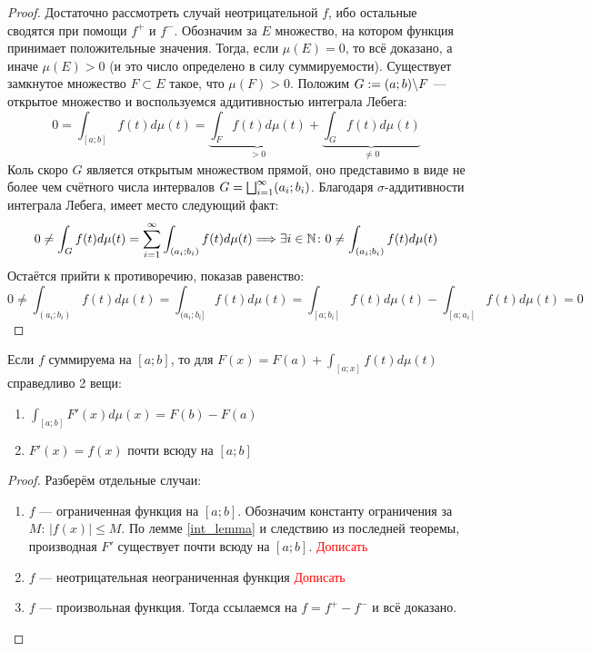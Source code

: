 \begin{proof}
	Достаточно рассмотреть случай неотрицательной $f$, ибо остальные сводятся при помощи $f^+$ и $f^-$. Обозначим за $E$ множество, на котором функция принимает положительные значения. Тогда, если $\mu(E) = 0$, то всё доказано, а иначе $\mu(E) > 0$ (и это число определено в силу суммируемости). Существует замкнутое множество $F \subset E$ такое, что $\mu(F) > 0$. Положим $G := (a; b) \backslash F$ --- открытое множество и воспользуемся аддитивностью интеграла Лебега:
	\[
		0 = \int_{[a; b]} f(t)d\mu(t) = \underbrace{\int_F f(t)d\mu(t)}_{> 0} + \underbrace{\int_G f(t)d\mu(t)}_{\neq 0}
	\]
	Коль скоро $G$ является открытым множеством прямой, оно представимо в виде не более чем счётного числа интервалов $G = \bigsqcup_{i = 1}^\infty (a_i; b_i)$. Благодаря $\sigma$-аддитивности интеграла Лебега, имеет место следующий факт:
	\[
		0 \neq \int_G f(t)d\mu(t) = \sum_{i = 1}^\infty \int_{(a_i; b_i)} f(t)d\mu(t) \Longrightarrow \exists i \in \mathbb{N} \colon 0 \neq \int_{(a_i; b_i)} f(t)d\mu(t)
	\]
	Остаётся прийти к противоречию, показав равенство:
	\[
		0 \neq \int_{(a_i; b_i)} f(t)d\mu(t) = \int_{(a_i; b_i]} f(t)d\mu(t) = \int_{[a; b_i]} f(t)d\mu(t) - \int_{[a; a_i]} f(t)d\mu(t) = 0
	\]
\end{proof}

\begin{theorem}
	Если $f$ суммируема на $[a; b]$, то для $F(x) = F(a) + \int_{[a; x]}f(t)d\mu(t)$ справедливо 2 вещи:
	\begin{enumerate}
		\item $\int_{[a; b]} F'(x)d\mu(x) = F(b) - F(a)$
		
		\item $F'(x) = f(x)$ почти всюду на $[a; b]$
	\end{enumerate}
\end{theorem}

\begin{proof}
	Разберём отдельные случаи:
	\begin{enumerate}
		\item $f$ --- ограниченная функция на $[a; b]$. Обозначим константу ограничения за $M$: $|f(x)| \le M$. По лемме \ref{int_lemma} и следствию из последней теоремы, производная $F'$ существует почти всюду на $[a; b]$.
		\textcolor{red}{Дописать}
		
		\item $f$ --- неотрицательная неограниченная функция
		\textcolor{red}{Дописать}
		
		\item $f$ --- произвольная функция. Тогда ссылаемся на $f = f^+ - f^-$ и всё доказано.
	\end{enumerate}
\end{proof}

